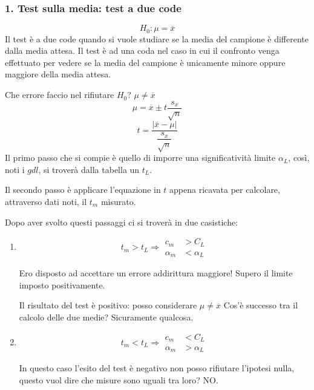 \documentclass[a4paper, 15pt]{article}
\begin{document}
\subsubsection{1. Test sulla media: test a due code}
\begin{adjustwidth}{2in}{}
		\[H_0: \mu = \overline{x}\]		
		Il test è a due code quando si vuole studiare se la media del campione è differente dalla media attesa. Il test è ad una coda nel caso in cui il confronto venga effettuato per vedere se la media del campione è unicamente minore oppure maggiore della media attesa.\newline 
		
		Che errore faccio nel rifiutare $H_0$? \(\mu \ne \overline{x}\)
		\[\mu = \overline{x} \pm t\dfrac{s_x}{\sqrt{n}}\]
		\[t = \dfrac{|\overline{x}-\mu|}{\dfrac{s_x}{\sqrt{n}}}\]
		Il primo passo che si compie è quello di imporre una significatività limite $\alpha_L$, così, noti i $gdl$, si troverà dalla tabella un $t_L$. 
		
		Il secondo passo è applicare l'equazione in $t$ appena ricavata per calcolare, attraverso dati noti, il $t_m$ misurato. \newline 
		
		Dopo aver svolto questi passaggi ci si troverà in due casistiche:
		\begin{enumerate}
			\item \[t_m>t_L \Rightarrow \begin{aligned}
				c_m&>C_L \\
				\alpha_m&<\alpha_L
			\end{aligned}\]
		
		Ero disposto ad accettare un errore addirittura maggiore! Supero il limite imposto positivamente. 
		
		Il risultato del test è positivo: posso considerare \(\mu \ne \overline{x}\) Cos'è successo tra il calcolo delle due medie? Sicuramente qualcosa. 
		
		\item \[t_m<t_L \Rightarrow \begin{aligned}
			c_m&<C_L \\
			\alpha_m&>\alpha_L
		\end{aligned}\]
	
		In questo caso l'esito del test è negativo non posso rifiutare l'ipotesi nulla, questo vuol dire che misure sono uguali tra loro? NO. 
		

\end{enumerate}
\end{adjustwidth}
\end{document}
